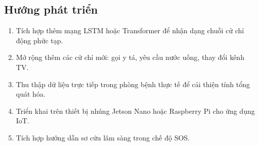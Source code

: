 \documentclass[conference]{IEEEtran}
\begin{document}
\subsection{Hướng phát triển}

\begin{enumerate}
    \item Tích hợp thêm mạng LSTM hoặc Transformer để nhận dạng chuỗi cử chỉ động phức tạp.
    \item Mở rộng thêm các cử chỉ mới: gọi y tá, yêu cầu nước uống, thay đổi kênh TV.
    \item Thu thập dữ liệu trực tiếp trong phòng bệnh thực tế để cải thiện tính tổng quát hóa.
    \item Triển khai trên thiết bị nhúng Jetson Nano hoặc Raspberry Pi cho ứng dụng IoT.
    \item Tích hợp hướng dẫn sơ cứu lâm sàng trong chế độ SOS.
\end{enumerate}
\end{document}

